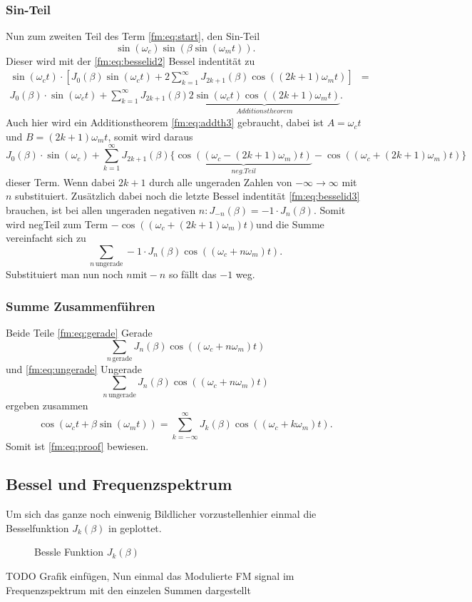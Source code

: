 \subsubsection{Sin-Teil}
Nun zum zweiten Teil des Term \eqref{fm:eq:start}, den Sin-Teil
\[
    \sin(\omega_c)\sin(\beta\sin(\omega_m t)).
\]
Dieser wird mit der \eqref{fm:eq:besselid2} Bessel indentität zu
\begin{align*}
    \sin(\omega_c t) \cdot [J_0(\beta)  \sin(\omega_c t) + 2\sum_{k=1}^\infty J_{2k+1}(\beta) \cos((2k+1)\omega_m t)]
    &=\\
    J_0(\beta) \cdot \sin(\omega_c t) + \sum_{k=1}^\infty J_{2k+1}(\beta) \underbrace{2\sin(\omega_c t)\cos((2k+1)\omega_m t)}_{Additionstheorem}.
\end{align*}
Auch hier wird ein Additionstheorem \eqref{fm:eq:addth3} gebraucht, dabei ist \(A = \omega_c t\) und \(B = (2k+1)\omega_m t \), 
somit wird daraus
\[
    J_0(\beta) \cdot \sin(\omega_c) + \sum_{k=1}^\infty J_{2k+1}(\beta) \{ \underbrace{\cos((\omega_c-(2k+1)\omega_m) t)}_{neg.Teil} - \cos((\omega_c+(2k+1)\omega_m) t) \}
\]dieser Term.
Wenn dabei \(2k +1\) durch alle ungeraden Zahlen von \(-\infty \to \infty\) mit \(n\) substituiert.
Zusätzlich dabei noch die letzte Bessel indentität \eqref{fm:eq:besselid3} brauchen, ist bei allen ungeraden negativen \(n : J_{-n}(\beta) = -1\cdot J_n(\beta)\).
Somit wird negTeil zum Term \(-\cos((\omega_c+(2k+1)\omega_m) t)\)und die Summe vereinfacht sich zu
\[
     \sum_{n\, \text{ungerade}} -1 \cdot J_{n}(\beta) \cos((\omega_c + n\omega_m) t).
     \label{fm:eq:ungerade}
\]
Substituiert man nun noch \(n \text{mit} -n \) so fällt das \(-1\) weg.

\subsubsection{Summe Zusammenführen}
Beide Teile \eqref{fm:eq:gerade} Gerade 
\[
    \sum_{n\, \text{gerade}} J_{n}(\beta) \cos((\omega_c + n\omega_m) t)
\]und \eqref{fm:eq:ungerade} Ungerade 
\[
    \sum_{n\, \text{ungerade}} J_{n}(\beta) \cos((\omega_c + n\omega_m) t)
\]
ergeben zusammen
\[
    \cos(\omega_ct+\beta\sin(\omega_mt))
    =
    \sum_{k= -\infty}^\infty J_{k}(\beta) \cos((\omega_c+k\omega_m)t).
\]
Somit ist \eqref{fm:eq:proof} bewiesen.
\newpage

\subsection{Bessel und Frequenzspektrum}
Um sich das ganze noch einwenig Bildlicher vorzustellenhier einmal die Besselfunktion \(J_{k}(\beta)\) in geplottet.
\begin{figure}
	\centering
%	
	\caption{Bessle Funktion \(J_{k}(\beta)\)}
	\label{fig:bessel}
\end{figure}
TODO Grafik einfügen,
\newline
Nun einmal das Modulierte FM signal im Frequenzspektrum mit den einzelen Summen dargestellt

